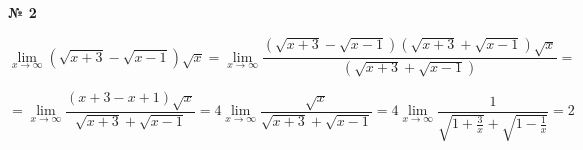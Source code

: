 \documentclass{article}
\begin{document}
\textbf{№ 2} 
\large

$$ \lim\limits_{x \to \infty} \left( \sqrt{x+3} - \sqrt{x-1} \right) \sqrt{x}
= \lim\limits_{x \to \infty} \frac{ \left( \sqrt{x+3} - \sqrt{x-1} \right)  \left( \sqrt{x+3} + \sqrt{x-1} \right) \sqrt{x}}{\left( \sqrt{x+3} + \sqrt{x-1} \right)}
= $$  

$$ = \lim\limits_{x \to \infty} \frac{ \left( x+3-x+1 \right) \sqrt{x}}{\sqrt{x+3} + \sqrt{x-1}} 
= 4\lim\limits_{x \to \infty} \frac{ \sqrt{x}}{\sqrt{x+3} + \sqrt{x-1}} 
= 4\lim\limits_{x \to \infty} \frac{1}{\sqrt{1+\frac{3}{x}} + \sqrt{1-\frac{1}{x}}} 
= 2 $$
\end{document}
